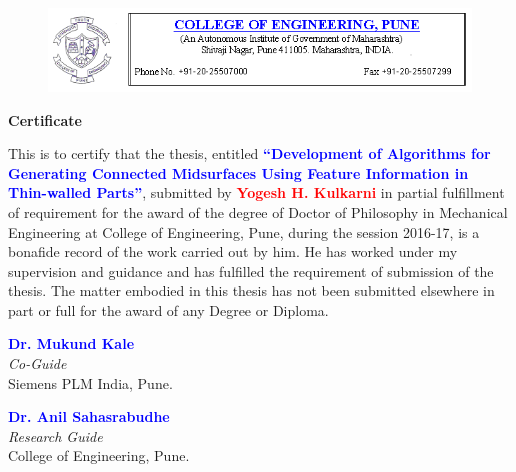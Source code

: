 \begin{figure} [!h]
	\centering
	\includegraphics[width=\textwidth]{..//Common/images/coep_header.png}
\end{figure}

\vspace*{50pt}

\begin{center}{\Huge \textbf{Certificate}}\end{center}

\vspace*{20pt}

\begin{flushleft}
This is to certify that the thesis, entitled \textcolor{blue}{\textbf{``Development of Algorithms for Generating Connected Midsurfaces Using Feature Information in Thin-walled Parts''}}, submitted by \textcolor{red}{\textbf{Yogesh H. Kulkarni}} in partial fulfillment of requirement for the award of the degree of Doctor of Philosophy in Mechanical Engineering at College of Engineering, Pune, during the session 2016-17, is a bonafide record of the work carried out by him. He has worked under my supervision and guidance and has fulfilled the requirement of submission of the thesis. The matter embodied in this thesis has not been submitted elsewhere in part or full for the award of any Degree or Diploma.
\end{flushleft}

\vspace*{120pt}

\begin{minipage}[t]{0.5\textwidth}%
\begin{flushleft}
 \textcolor{blue}{\textbf{Dr. Mukund Kale}}\\
\emph{Co-Guide}\\
Siemens PLM India, Pune.
\end{flushleft}
\end{minipage}\hspace{0.5cm}
\begin{minipage}[t]{0.4\textwidth}%
\begin{flushleft}
 {
\textcolor{blue}{\textbf{Dr. Anil Sahasrabudhe}}\\
\emph{Research Guide}}\\
College of Engineering, Pune.
\end{flushleft}

\end{minipage}

